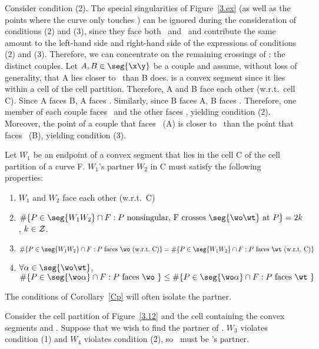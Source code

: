 Consider condition (2).
The special singularities of Figure~\ref{3.ex} (as well as the points where
the curve only touches ) can be ignored during 
the consideration of conditions (2) and (3), since they face both \x\ and 
\y\ and contribute the same amount to the left-hand side and right-hand side 
of the expressions of conditions (2) and (3).
Therefore, we can concentrate on the remaining crossings of \seg{\x\y}:
the distinct couples.
Let $A,B\in \seg{\x\y}$ be a couple and assume, without loss of generality, 
that A lies closer to \x\ than B does.
 is a convex segment since it lies within a cell of the cell
partition.
Therefore, A and B face each other (w.r.t.\ cell C).
Since A faces B, A faces \y.
Similarly, since B faces A, B faces \x.
Therefore, one member of each couple faces \x\ and the other faces \y,
yielding condition (2).
Moreover, the point of a couple that faces \y\ (A) is closer to \x\ than the point 
that faces \x\ (B), yielding condition (3).
\QED
%
\begin{corollary}
\label{Cp}
Let $W_{1}$ be an endpoint of a convex segment that lies in the cell C of the cell partition of a curve F.
$W_{1}$'s partner $W_{2}$ in C must satisfy the following properties:
\begin{enumerate}
\item 
	$W_{1}$ and $W_{2}$ face each other (w.r.t.\ C)
\item
	$\#\{P \in \seg{W_{1}W_{2}} \cap F: P \mbox{ nonsingular,
	F crosses } \seg{\wo\wt} \mbox{ at } P\} = 2k$, $k \in {\cal Z}$.
\item 	
	$\#\{P \in \seg{W_{1}W_{2}} \cap F: P \mbox{ faces \wo\ (w.r.t.\ C)}\} = 
	 \#\{P \in \seg{W_{1}W_{2}} \cap F: P \mbox{ faces \wt\ (w.r.t.\ C)}\}$
\item
	$\forall \alpha \in \seg{\wo\wt}$,\ \ \nopagebreak
	$\#\{P \in\seg{\wo\alpha}\cap F: P \mbox{ faces \wo\ }\} \leq 
 	 \#\{P \in\seg{\wo\alpha}\cap F: P \mbox{ faces \wt\ }\} $
\end{enumerate}
\end{corollary}

\noindent The conditions of Corollary~\ref{Cp} will often isolate the partner.

\begin{example}
Consider the cell partition of Figure~\ref{3.12} and the cell containing
the convex segments \arc{\wo\wt} and .
Suppose that we wish to find the partner of \wo.
$W_{3}$ violates condition (1) and $W_{4}$ violates condition (2), 
so \wt\ must be \wo's partner.
\end{example}

